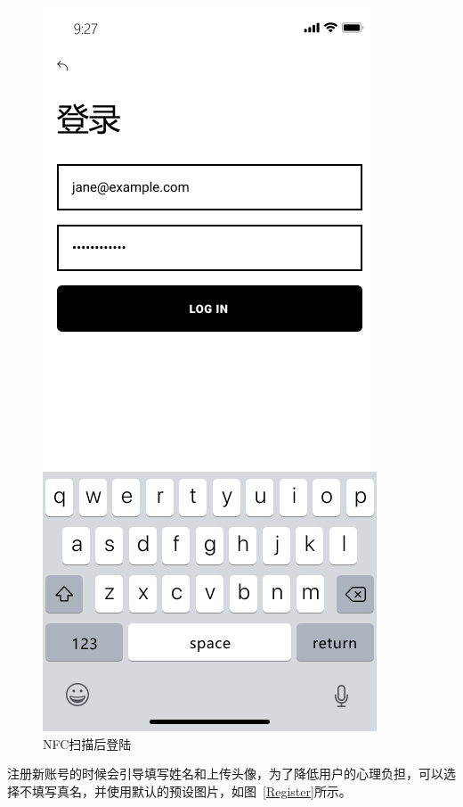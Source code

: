 \documentclass[UTF8]{ctexart}
\begin{document}
\begin{figure}[htbp]
{\begin{minipage}[b]{.3\linewidth}
            \includegraphics[scale=0.3]{Login.png}
        \end{minipage}
    }
    \caption{NFC扫描后登陆}
    \label{Login}
\end{figure}

注册新账号的时候会引导填写姓名和上传头像，为了降低用户的心理负担，可以选择不填写真名，并使用默认的预设图片，如图~\ref{Register}所示。
\end{document}

